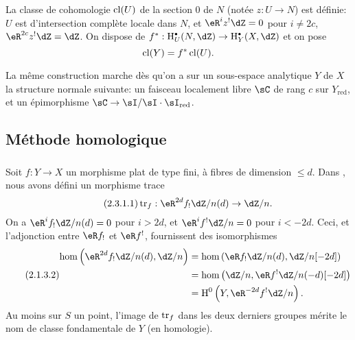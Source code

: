 La classe de cohomologie $\operatorname{cl}(U)$ de la section $0$ de $N$ (notée $z:U\to N$) 
est définie: $U$ est d'intersection complète locale dans $N$, et 
$\eR^i z^!\dZ = 0$ pour $i\ne 2 c$, $\eR^{2 c} z^!\dZ = \dZ$. On dispose de 
$f^*:\h_U^\bullet(N,\dZ) \to \h_Y^\bullet(X,\dZ)$ et on pose 
\[
  \operatorname{cl}(Y) = f^*\operatorname{cl}(U) \text{.}
\]

La même construction marche dès qu'on a sur un sous-espace analytique $Y$ 
de $X$ la structure normale suivante: un faisceau localement libre $\sC$ de 
rang $c$ sur $Y_\text{red}$, et un épimorphisme 
$\sC\to \sI/\sI\cdot \sI_\text{red}$. 










\subsection{Méthode homologique}\label{IV:2-3}





\subsubsection{}\label{IV:2-3-1}

Soit $f:Y\to X$ un morphisme plat de type fini, à fibres de dimension 
$\leqslant d$. Dans \cite[XVIII 2.9]{sga4}, nous avons défini un morphisme 
trace 
\begin{equation*}\tag{2.3.1.1}\label{IV:eq:2-3-1-1}
  \tr_f:\eR^{2 d} f_! \dZ/n(d) \to \dZ/n \text{.}
\end{equation*}
On a $\eR^i f_!\dZ/n(d)=0$ pour $i>2 d$, et $\eR^i f^!\dZ/n=0$ pour $i<-2 d$. 
Ceci, et l'adjonction entre $\eR f_!$ et $\eR f^!$, fournissent des isomorphismes 
\begin{equation*}\tag{2.1.3.2}\label{IV:eq:2-1-3-2}
\begin{aligned}
  \hom\left(\eR^{2 d}f_!\dZ/n(d),\dZ/n\right) 
    &= \hom\left(\eR f_!\dZ/n(d),\dZ/n[-2 d]\right) \\
    &= \hom\left(\dZ/n,\eR f^!\dZ/n(-d)[-2 d]\right) \\
    &= \h^0\left(Y,\eR^{-2 d}f^!\dZ/n\right) \text{.}
\end{aligned}
\end{equation*}
Au moins sur $S$ un point, l'image de $\operatorname{tr}_f$ dans les deux derniers groupes 
mérite le nom de classe fondamentale de $Y$ (en homologie). 

